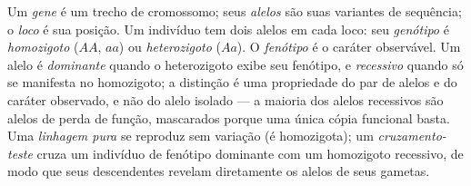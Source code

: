 \begin{definition}\label{def:b2:meiosis-heredity:vocabulary}
Um \emph{gene} é um trecho de cromossomo; seus \emph{alelos} são suas
variantes de sequência; o \emph{loco} é sua posição. Um indivíduo
 tem dois alelos em cada loco: seu \emph{genótipo} é
\emph{homozigoto} ($AA$, $aa$) ou \emph{heterozigoto} ($Aa$). O
\emph{fenótipo} é o caráter observável. Um alelo é
\emph{dominante} quando o heterozigoto exibe seu fenótipo, e
\emph{recessivo} quando só se manifesta no homozigoto; a distinção é
uma propriedade do par de alelos e do caráter observado, e não do
alelo isolado --- a maioria dos alelos recessivos são alelos de perda
de função, mascarados porque uma única cópia funcional basta. Uma
\emph{linhagem pura} se reproduz sem variação (é homozigota); um
\emph{cruzamento-teste} cruza um indivíduo de fenótipo dominante com
um homozigoto recessivo, de modo que seus descendentes revelam
diretamente os alelos de seus gametas.
\end{definition}

